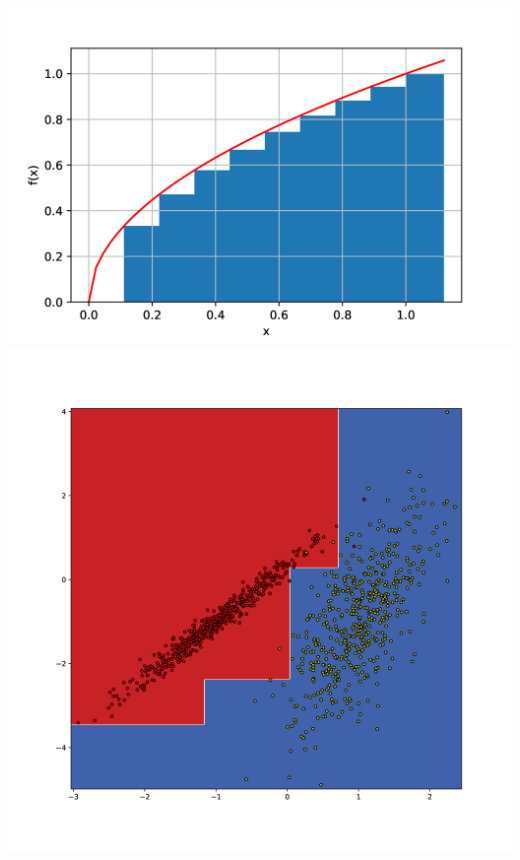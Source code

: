 \documentclass[aspectratio=169,usenames,dvipsnames]{beamer}
\begin{document}
\begin{frame}
\begin{columns}
\begin{minipage}{\linewidth}
\centering
\includegraphics[width=0.8\linewidth]{images/plot.png}\\
\includegraphics[width=0.8\linewidth]{images/4gi.png}\\
\end{minipage}
\end{columns}
\end{frame}

\end{document}
